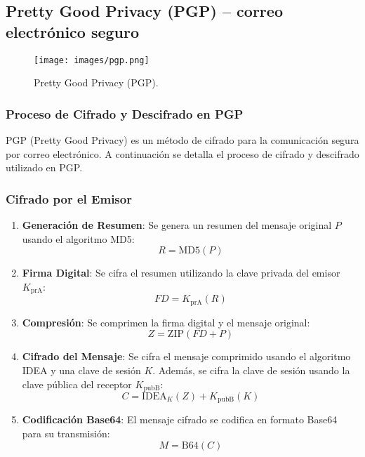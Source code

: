 \documentclass[a4paper,12pt]{article}
\begin{document}
\subsection{Pretty Good Privacy (PGP) -- correo electrónico seguro}

\begin{figure}[H]
    \centering
    \texttt{[image: images/pgp.png]}
    \caption{Pretty Good Privacy (PGP).}
\end{figure}

\subsubsection*{Proceso de Cifrado y Descifrado en PGP}

PGP (Pretty Good Privacy) es un método de cifrado para la comunicación segura por correo electrónico. A continuación se detalla el proceso de cifrado y descifrado utilizado en PGP.

\subsubsection*{Cifrado por el Emisor}
\begin{enumerate}
    \item \textbf{Generación de Resumen}: Se genera un resumen del mensaje original \(P\) usando el algoritmo MD5:
    \begin{equation}
        R = \text{MD5}(P)
    \end{equation}
    \item \textbf{Firma Digital}: Se cifra el resumen utilizando la clave privada del emisor \(K_{\text{prA}}\):
    \begin{equation}
        FD = K_{\text{prA}}(R)
    \end{equation}
    \item \textbf{Compresión}: Se comprimen la firma digital y el mensaje original:
    \begin{equation}
        Z = \text{ZIP}(FD + P)
    \end{equation}
    \item \textbf{Cifrado del Mensaje}: Se cifra el mensaje comprimido usando el algoritmo IDEA y una clave de sesión \(K\). Además, se cifra la clave de sesión usando la clave pública del receptor \(K_{\text{pubB}}\):
    \begin{equation}
        C = \text{IDEA}_K(Z) + K_{\text{pubB}}(K)
    \end{equation}
    \item \textbf{Codificación Base64}: El mensaje cifrado se codifica en formato Base64 para su transmisión:
    \begin{equation}
        M = \text{B64}(C)
    \end{equation}
\end{enumerate}
\end{document}
